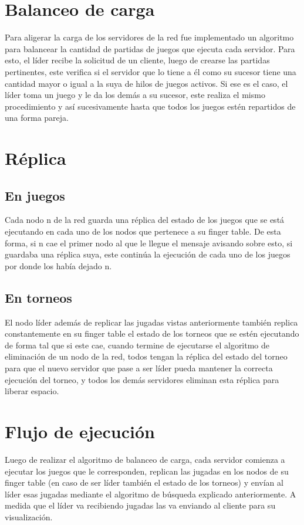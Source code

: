 \documentclass[10pt, a4paper]{article}
\begin{document}
    \section{Balanceo de carga}
    Para aligerar la carga de los servidores de la red fue implementado un algoritmo para balancear la cantidad de partidas de juegos que ejecuta cada servidor. Para esto, el líder recibe la solicitud de un cliente, luego de crearse las partidas pertinentes, este verifica si el servidor que lo tiene a él como su sucesor tiene una cantidad mayor o igual a la suya de hilos de juegos activos. Si ese es el caso, el líder toma un juego y le da los demás a su sucesor, este realiza el mismo procedimiento y así sucesivamente hasta que todos los juegos estén repartidos de una forma pareja.
    
    \section{R\'eplica}
    \subsection{En juegos}
    Cada nodo n de la red guarda una réplica del estado de los juegos que se está ejecutando en cada uno de los nodos que pertenece a su finger table. De esta forma, si n cae el primer nodo al que le llegue el mensaje avisando sobre esto, si guardaba una réplica suya, este continúa la ejecución de cada uno de los juegos por donde los había dejado n.\\
    
    \subsection{En torneos}
    El nodo líder además de replicar las jugadas vistas anteriormente también replica constantemente en su finger table el estado de los torneos que se estén ejecutando de forma tal que si este cae, cuando termine de ejecutarse el algoritmo de eliminación de un nodo de la red, todos tengan la réplica del estado del torneo para que el nuevo servidor que pase a ser líder pueda mantener la correcta ejecución del torneo, y todos los demás servidores eliminan esta réplica para liberar espacio.
    
    \section{Flujo de ejecución}
    Luego de realizar el algoritmo de balanceo de carga, cada servidor comienza a ejecutar los juegos que le corresponden, replican las jugadas en los nodos de su finger table (en caso de ser líder también el estado de los torneos) y envían al líder esas jugadas mediante el algoritmo de búsqueda explicado anteriormente. A medida que el líder va recibiendo jugadas las va enviando al cliente para su visualización.
    
\end{document}
